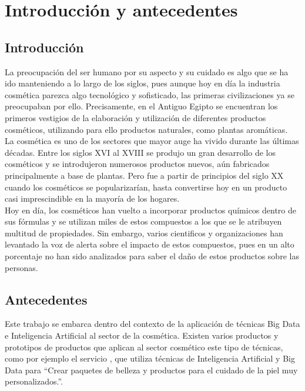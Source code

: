 
\chapter{Introducción y antecedentes} %
\label{chap:introduction} %

\section{Introducción}

La preocupación del ser humano por su aspecto y su cuidado es algo que se ha ido manteniendo a lo largo de los siglos, pues aunque hoy en día la industria cosmética parezca algo tecnológico y sofisticado, las primeras civilizaciones ya se preocupaban por ello. Precisamente, en el Antiguo Egipto se encuentran los primeros vestigios de la elaboración y utilización de diferentes productos cosméticos, utilizando para ello productos naturales, como plantas aromáticas. \\

La cosmética es uno de los sectores que mayor auge ha vivido durante las últimas décadas. Entre los siglos XVI al XVIII se produjo un gran desarrollo de los cosméticos y se introdujeron numerosos productos nuevos, aún fabricados principalmente a base de plantas. Pero fue a partir de principios del siglo XX cuando los cosméticos se popularizarían, hasta convertirse hoy en un producto casi imprescindible en la mayoría de los hogares. \\

Hoy en día, los cosméticos han vuelto a incorporar productos químicos dentro de sus fórmulas y se utilizan miles de estos compuestos a los que se le atribuyen multitud de propiedades. Sin embargo, varios cientificos y organizaciones han levantado la voz de alerta sobre el impacto de estos compuestos, pues en un alto porcentaje no han sido analizados para saber el daño de estos productos sobre las personas.



\section{Antecedentes}

Este trabajo se embarca dentro del contexto de la aplicación de técnicas Big Data e Inteligencia Artificial al sector de la cosmética. Existen varios productos y prototipos de productos que aplican al sector cosmético este tipo de técnicas, como por ejemplo el servicio \href{https://rewisor.com/la-ia-y-el-big-data-llegan-pisando-fuerte-al-mundo-de-la-cosmetica/}{}, que utiliza técnicas de Inteligencia Artificial y Big Data para ``Crear paquetes de belleza y productos para el cuidado de la piel muy personalizados.''. 





